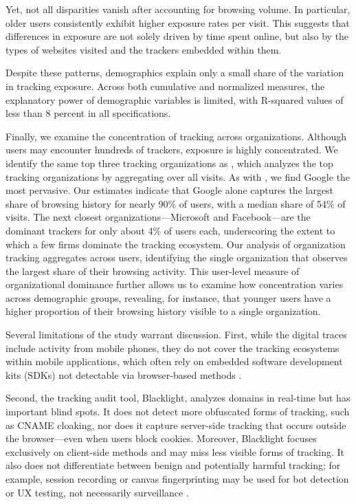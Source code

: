 \documentclass[12pt, letterpaper]{article}
\begin{document}
Yet, not all disparities vanish after accounting for browsing volume. In particular, older users consistently exhibit higher exposure rates per visit. This suggests that differences in exposure are not solely driven by time spent online, but also by the types of websites visited and the trackers embedded within them.

Despite these patterns, demographics explain only a small share of the variation in tracking exposure. Across both cumulative and normalized measures, the explanatory power of demographic variables is limited, with R-squared values of less than 8 percent in all specifications.

Finally, we examine the concentration of tracking across organizations. Although users may encounter hundreds of trackers, exposure is highly concentrated. 
We identify the same top three tracking organizations as \cite{Dambra2022}, which analyzes the top tracking organizations by aggregating over all visits.
As with \cite{Dambra2022}, we find Google the most pervasive.
Our estimates indicate that Google alone captures the largest share of browsing history for nearly 90\% of users, with a median share of 54\% of visits.
The next closest organizations---Microsoft and Facebook---are the dominant trackers for only about 4\% of users each, underscoring the extent to which a few firms dominate the tracking ecosystem.
Our analysis of organization tracking aggregates across users, identifying the single organization that observes the largest share of their browsing activity.
This user-level measure of organizational dominance further allows us to examine how concentration varies across demographic groups, revealing, for instance, that younger users have a higher proportion of their browsing history visible to a single organization.

Several limitations of the study warrant discussion. First, while the digital traces include activity from mobile phones, they do not cover the tracking ecosystems within mobile applications, which often rely on embedded software development kits (SDKs) not detectable via browser-based methods \citep{achara2015unicity, Binns2018}.

Second, the tracking audit tool, Blacklight, analyzes domains in real-time but has important blind spots. It does not detect more obfuscated forms of tracking, such as CNAME cloaking, nor does it capture server-side tracking that occurs outside the browser—even when users block cookies. Moreover, Blacklight focuses exclusively on client-side methods and may miss less visible forms of tracking. It also does not differentiate between benign and potentially harmful tracking; for example, session recording or canvas fingerprinting may be used for bot detection or UX testing, not necessarily surveillance \citep{blacklight, leakyforms}.
\end{document}
